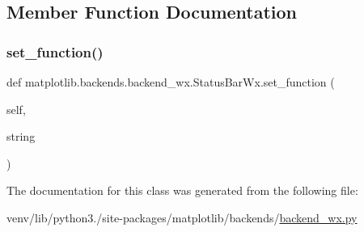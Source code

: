 \subsection{Member Function Documentation}
\mbox{\label{classmatplotlib_1_1backends_1_1backend__wx_1_1StatusBarWx_aec8b3bd0a19ff85bfe65fa1b735eff89}} 
\subsubsection{\texorpdfstring{set\+\_\+function()}{set\_function()}}
{\footnotesize\ttfamily def matplotlib.\+backends.\+backend\+\_\+wx.\+Status\+Bar\+Wx.\+set\+\_\+function (\begin{DoxyParamCaption}\item[{}]{self,  }\item[{}]{string }\end{DoxyParamCaption})}



The documentation for this class was generated from the following file\+:\begin{DoxyCompactItemize}
\item 
venv/lib/python3./site-\/packages/matplotlib/backends/\hyperlink{backend__wx_8py}{backend\+\_\+wx.\+py}\end{DoxyCompactItemize}
